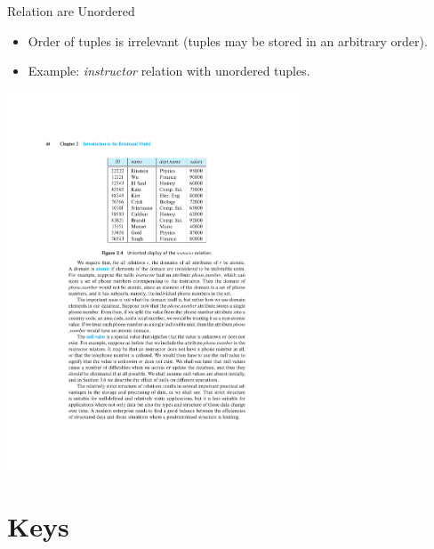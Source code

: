 \documentclass{beamer}
\begin{document}
\begin{frame}{Relation are Unordered}
    \begin{itemize}
        \item Order of tuples is irrelevant (tuples may be stored in an arbitrary order).
        \item Example: \textit{instructor} relation with unordered tuples.
    \end{itemize}
    \centering
    \vspace{5mm}
    \includegraphics[width=0.65\textwidth, trim={7.25cm 16.75cm 6.5cm 4.75cm}, clip]{figures/Instructor_unordered}
\end{frame}

\section{Keys}
\end{document}
